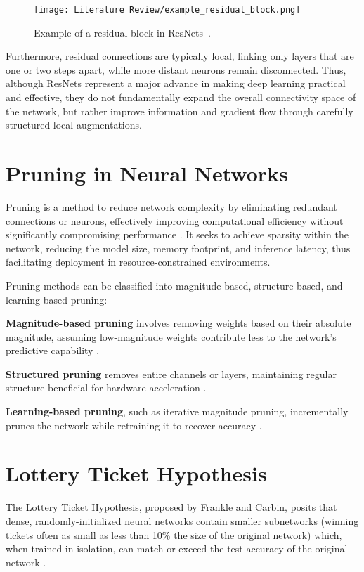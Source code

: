 \begin{figure}[h!]
    \centering
    \texttt{[image: Literature Review/example\_residual\_block.png]}
    \caption{Example of a residual block in ResNets~\cite{he2016deep}.}
    \label{fig:exampleResNet}
\end{figure}


Furthermore, residual connections are typically local, linking only layers that are one or two steps apart, while more distant neurons remain disconnected. Thus, although ResNets represent a major advance in making deep learning practical and effective, they do not fundamentally expand the overall connectivity space of the network, but rather improve information and gradient flow through carefully structured local augmentations.


\section{Pruning in Neural Networks}
Pruning is a method to reduce network complexity by eliminating redundant connections or neurons, effectively improving computational efficiency without significantly compromising performance \cite{han2015learning}. It seeks to achieve sparsity within the network, reducing the model size, memory footprint, and inference latency, thus facilitating deployment in resource-constrained environments.

Pruning methods can be classified into magnitude-based, structure-based, and learning-based pruning:

\textbf{Magnitude-based pruning} involves removing weights based on their absolute magnitude, assuming low-magnitude weights contribute less to the network's predictive capability \cite{han2015learning}.

\textbf{Structured pruning} removes entire channels or layers, maintaining regular structure beneficial for hardware acceleration \cite{he2017channel}.

\textbf{Learning-based pruning}, such as iterative magnitude pruning, incrementally prunes the network while retraining it to recover accuracy \cite{han2015learning}.

\section{Lottery Ticket Hypothesis}
The Lottery Ticket Hypothesis, proposed by Frankle and Carbin, posits that dense, randomly-initialized neural networks contain smaller subnetworks (winning tickets often as small as less than 10\% the size of the original network) which, when trained in isolation, can match or exceed the test accuracy of the original network \cite{frankle2018lottery}.

